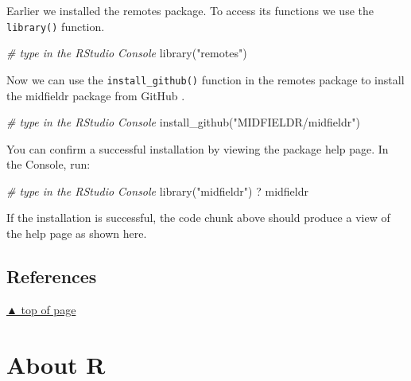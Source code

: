 \documentclass[
]{book}
\newenvironment{Shaded}{\begin{snugshade}}{\end{snugshade}}
\newcommand{\CommentTok}[1]{\textcolor[rgb]{0.56,0.35,0.01}{\textit{#1}}}
\newcommand{\FunctionTok}[1]{\textcolor[rgb]{0.00,0.00,0.00}{#1}}
\newcommand{\NormalTok}[1]{#1}
\newcommand{\StringTok}[1]{\textcolor[rgb]{0.31,0.60,0.02}{#1}}
\newlength{\cslhangindent}
\newlength{\cslentryspacingunit} %
\newenvironment{CSLReferences}[2] %
 {%
  \setlength{\parindent}{0pt}
  \ifodd #1
  \let\oldpar\par
  \def\par{\hangindent=\cslhangindent\oldpar}
  \fi
  \setlength{\parskip}{#2\cslentryspacingunit}
 }%
 {}
\begin{document}
Earlier we installed the remotes package. To access its functions we use the \texttt{library()} function.

\begin{Shaded}
\begin{Highlighting}[]
\CommentTok{\# type in the RStudio Console  }
\FunctionTok{library}\NormalTok{(}\StringTok{"remotes"}\NormalTok{)}
\end{Highlighting}
\end{Shaded}

Now we can use the \texttt{install\_github()} function in the remotes package to install the midfieldr package from GitHub \citep{R-midfieldr}.

\begin{Shaded}
\begin{Highlighting}[]
\CommentTok{\# type in the RStudio Console  }
\FunctionTok{install\_github}\NormalTok{(}\StringTok{"MIDFIELDR/midfieldr"}\NormalTok{)}
\end{Highlighting}
\end{Shaded}

You can confirm a successful installation by viewing the package help page. In the Console, run:

\begin{Shaded}
\begin{Highlighting}[]
\CommentTok{\# type in the RStudio Console }
\FunctionTok{library}\NormalTok{(}\StringTok{"midfieldr"}\NormalTok{)}
\NormalTok{? midfieldr}
\end{Highlighting}
\end{Shaded}

If the installation is successful, the code chunk above should produce a view of the help page as shown here.

\hypertarget{references}{%
\section*{References}\label{references}}

\hypertarget{refs}{}
\begin{CSLReferences}{0}{0}
\end{CSLReferences}

\protect\hyperlink{get-start-r}{▲ top of page}

\hypertarget{about-R}{%
\chapter{About R}\label{about-R}}
\end{document}
